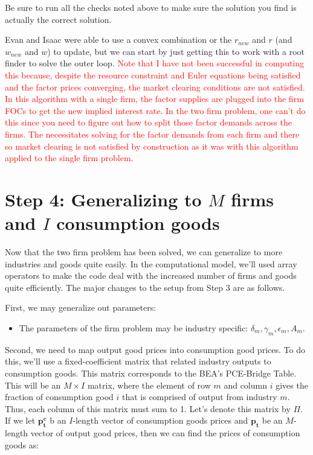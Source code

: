 \documentclass[letterpaper,12pt]{article}
\theoremstyle{definition}
\begin{document}
\begin{spacing}{1.5}
Be sure to run all the checks noted above to make sure the solution you find is actually the correct solution.

Evan and Isaac were able to use a convex combination or the $r_{new}$ and $r$ (and $w_{new}$ and $w$) to update, but we can start by just getting this to work with a root finder to solve the outer loop.  \textcolor{red}{Note that I have not been successful in computing this because, despite the resource constraint and Euler equations being satisfied and the factor prices converging, the market clearing conditions are not satisfied.  In this algorithm with a single firm, the factor supplies are plugged into the firm FOCs to get the new implied interest rate.  In the two firm problem, one can't do this since you need to figure out how to split those factor demands across the firms.  The necessitates solving for the factor demands from each firm and there so market clearing is not satisfied by construction as it was with this algorithm applied to the single firm problem.}

\section*{Step 4: Generalizing to $M$ firms and $I$ consumption goods}

Now that the two firm problem has been solved, we can generalize to more industries and goods quite easily.  In the computational model, we'll used array operators to make the code deal with the increased number of firms and goods quite efficiently.  The major changes to the setup from Step 3 are as follows.

First, we may generalize out parameters:
\begin{itemize}
\item The parameters of the firm problem may be industry specific: $\delta_{m}, \gamma_{m}, \epsilon_{m}, A_{m}$.
\end{itemize}

Second, we need to map output good prices into consumption good prices.  To do this, we'll use a fixed-coefficient matrix that related industry outputs to consumption goods.  This matrix corresponds to the BEA's PCE-Bridge Table.  This will be an $M\times I$ matrix, where the element of row $m$ and column $i$ gives the fraction of consumption good $i$ that is comprised of output from industry $m$.  Thus, each column of this matrix must sum to 1.  Let's denote this matrix by $\Pi$.  If we let $\boldsymbol{p^{c}_{t}}$ b an $I$-length vector of consumption goods prices and $\boldsymbol{p_{t}}$ be an $M$-length vector of output good prices, then we can find the prices of consumption goods as:


\end{spacing}
\end{document}
